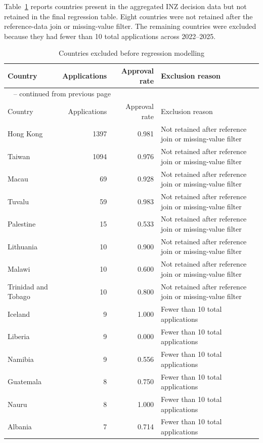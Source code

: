 \documentclass[runningheads]{llncs}
\begin{document}
Table~\ref{tab:appendix-excluded-countries} reports countries present in the aggregated INZ decision data but not retained in the final regression table. Eight countries were not retained after the reference-data join or missing-value filter. The remaining countries were excluded because they had fewer than 10 total applications across 2022--2025.

{\scriptsize
\renewcommand{\arraystretch}{1.12}
\setlength{\tabcolsep}{5pt}
\begin{longtable}{p{}rrp{}}
\caption{Countries excluded before regression modelling}\label{tab:appendix-excluded-countries}\\
\hline
Country & Applications & Approval rate & Exclusion reason \\
\hline
\endfirsthead
\multicolumn{4}{l}{\tablename\ \thetable{} -- continued from previous page}\\
\hline
Country & Applications & Approval rate & Exclusion reason \\
\hline
\endhead
Hong Kong & 1397 & 0.981 & Not retained after reference join or missing-value filter \\
Taiwan & 1094 & 0.976 & Not retained after reference join or missing-value filter \\
Macau & 69 & 0.928 & Not retained after reference join or missing-value filter \\
Tuvalu & 59 & 0.983 & Not retained after reference join or missing-value filter \\
Palestine & 15 & 0.533 & Not retained after reference join or missing-value filter \\
Lithuania & 10 & 0.900 & Not retained after reference join or missing-value filter \\
Malawi & 10 & 0.600 & Not retained after reference join or missing-value filter \\
Trinidad and Tobago & 10 & 0.800 & Not retained after reference join or missing-value filter \\
Iceland & 9 & 1.000 & Fewer than 10 total applications \\
Liberia & 9 & 0.000 & Fewer than 10 total applications \\
Namibia & 9 & 0.556 & Fewer than 10 total applications \\
Guatemala & 8 & 0.750 & Fewer than 10 total applications \\
Nauru & 8 & 1.000 & Fewer than 10 total applications \\
Albania & 7 & 0.714 & Fewer than 10 total applications \\

\end{longtable}}
\end{document}
